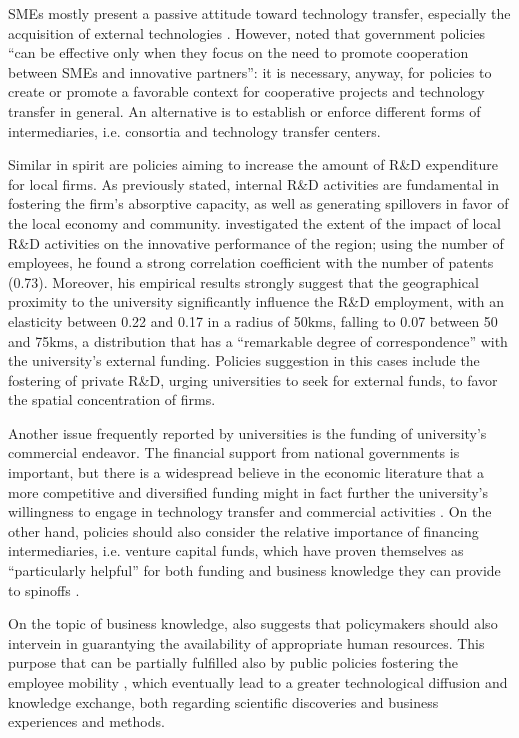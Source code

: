 SMEs mostly present a passive attitude toward technology transfer, especially the acquisition of external technologies \citep{Yusuf2008}. However, \citet{Zeng2010} noted that government policies \enquote{can be effective only when they focus on the need to promote cooperation between SMEs and innovative partners}: it is necessary, anyway, for policies to create or promote a favorable context for cooperative projects and technology transfer in general. An alternative is to establish or enforce different forms of intermediaries, i.e. consortia and technology transfer centers. 

Similar in spirit are policies aiming to increase the amount of R\&D expenditure for local firms. As previously stated, internal R\&D activities are fundamental in fostering the firm's absorptive capacity, as well as generating spillovers in favor of the local economy and community. \citet{Fritsch2007} investigated the extent of the impact of local R\&D activities on the innovative performance of the region; using the number of employees, he found a strong correlation coefficient with the number of patents (0.73). Moreover, his empirical results strongly suggest that the geographical proximity to the university significantly influence the R\&D employment, with an elasticity between 0.22 and 0.17 in a radius of 50kms, falling to 0.07 between 50 and 75kms, a distribution that has a \enquote{remarkable degree of correspondence} with the university's external funding. Policies suggestion in this cases include the fostering of private R\&D, urging universities to seek for external funds, to favor the spatial concentration of firms. 

Another issue frequently reported by universities is the funding of university's commercial endeavor. The financial support from national governments is important, but there is a widespread believe in the economic literature that a more competitive and diversified funding might in fact further the university's willingness to engage in technology transfer and commercial activities \citep{Rasmussen2006}. On the other hand, policies should also consider the relative importance of financing intermediaries, i.e. venture capital funds, which have proven themselves as \enquote{particularly helpful} for both funding and business knowledge they can provide to spinoffs \citep{Yusuf2008}.

On the topic of business knowledge, \citet{Chapple2005} also suggests that policymakers should also intervein in guarantying the availability of appropriate human resources. This purpose that can be partially fulfilled also by public policies fostering the employee mobility \citep{Franco2000}, which eventually lead to a greater technological diffusion and knowledge exchange, both regarding scientific discoveries and business experiences and methods. 

